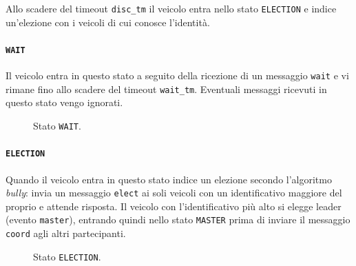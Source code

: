 \documentclass{memoir}
\begin{document}
Allo scadere del timeout \texttt{disc\_tm} il veicolo entra nello stato
\texttt{ELECTION} e indice un'elezione con i veicoli di cui conosce l'identità.

\paragraph{\texttt{WAIT}}
Il veicolo entra in questo stato a seguito della ricezione di un messaggio
\texttt{wait} e vi rimane fino allo scadere del timeout \texttt{wait\_tm}.
Eventuali messaggi ricevuti in questo stato vengo ignorati.

\begin{figure}[h]
  \centering
  \caption{Stato \texttt{WAIT}.}                  
\end{figure}

\paragraph{\texttt{ELECTION}}
Quando il veicolo entra in questo stato indice un elezione secondo l'algoritmo
\emph{bully}: invia un messaggio \texttt{elect} ai soli veicoli con un
identificativo maggiore del proprio e attende risposta. Il veicolo con
l'identificativo più alto si elegge leader (evento \texttt{master}), entrando
quindi nello stato \texttt{MASTER} prima di inviare il messaggio \texttt{coord}
agli altri partecipanti.

\begin{figure}[h]
  \centering
  \caption{Stato \texttt{ELECTION}.}                  
\end{figure}
\end{document}
